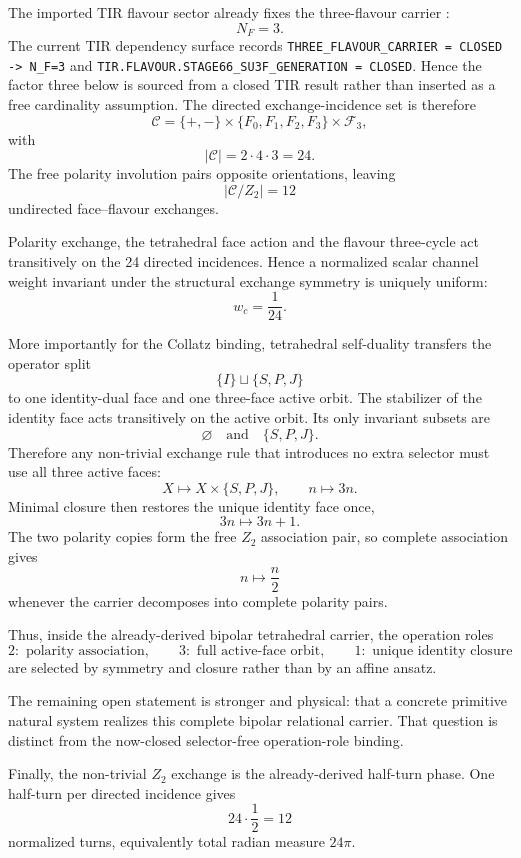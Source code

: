 \documentclass[11pt]{article}
\newcommand{\codeid}[1]{\nolinkurl{#1}}
\begin{document}
The imported TIR flavour sector already fixes the three-flavour carrier
\cite{LipaTIRFlavour2026}:
\[
\boxed{N_F=3.}
\]
The current TIR dependency surface records
\codeid{THREE_FLAVOUR_CARRIER = CLOSED -> N_F=3} and
\codeid{TIR.FLAVOUR.STAGE66_SU3F_GENERATION = CLOSED}. Hence the factor three
below is sourced from a closed TIR result rather than inserted as a free
cardinality assumption. The directed exchange-incidence set is therefore
\[
\mathcal C
=
\{+,-\}
\times
\{F_0,F_1,F_2,F_3\}
\times
\mathcal F_3,
\]
with
\[
\boxed{
|\mathcal C|
=
2\cdot4\cdot3
=
24.
}
\]
The free polarity involution pairs opposite orientations, leaving
\[
\boxed{
|\mathcal C/Z_2|
=
12
}
\]
undirected face--flavour exchanges.

Polarity exchange, the tetrahedral face action and the flavour three-cycle act
transitively on the 24 directed incidences. Hence a normalized scalar channel
weight invariant under the structural exchange symmetry is uniquely uniform:
\[
\boxed{
w_c=\frac1{24}.
}
\]

More importantly for the Collatz binding, tetrahedral self-duality transfers
the operator split
\[
\{I\}\sqcup\{S,P,J\}
\]
to one identity-dual face and one three-face active orbit. The stabilizer of the
identity face acts transitively on the active orbit. Its only invariant subsets
are
\[
\varnothing
\quad\text{and}\quad
\{S,P,J\}.
\]
Therefore any non-trivial exchange rule that introduces no extra selector must
use all three active faces:
\[
\boxed{
X\longmapsto X\times\{S,P,J\},
\qquad
n\longmapsto3n.
}
\]
Minimal closure then restores the unique identity face once,
\[
\boxed{
3n\longmapsto3n+1.
}
\]
The two polarity copies form the free \(Z_2\) association pair, so complete
association gives
\[
\boxed{
n\longmapsto\frac n2
}
\]
whenever the carrier decomposes into complete polarity pairs.

Thus, inside the already-derived bipolar tetrahedral carrier, the operation
roles
\[
\boxed{
2:\text{ polarity association},
\qquad
3:\text{ full active-face orbit},
\qquad
1:\text{ unique identity closure}
}
\]
are selected by symmetry and closure rather than by an affine ansatz.

The remaining open statement is stronger and physical: that a concrete
primitive natural system realizes this complete bipolar relational carrier.
That question is distinct from the now-closed selector-free operation-role
binding.

Finally, the non-trivial \(Z_2\) exchange is the already-derived half-turn
phase. One half-turn per directed incidence gives
\[
\boxed{
24\cdot\frac12=12
}
\]
normalized turns, equivalently total radian measure \(24\pi\).
\end{document}
